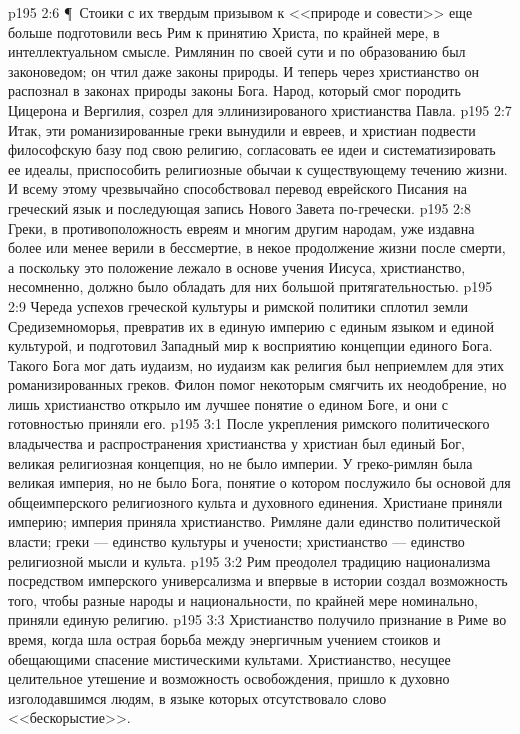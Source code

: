 \vs p195 2:6 \P\ Стоики с их твердым призывом к <<природе и совести>> еще больше подготовили весь Рим к принятию Христа, по крайней мере, в интеллектуальном смысле. Римлянин по своей сути и по образованию был законоведом; он чтил даже законы природы. И теперь через христианство он распознал в законах природы законы Бога. Народ, который смог породить Цицерона и Вергилия, созрел для эллинизированого христианства Павла.
\vs p195 2:7 Итак, эти романизированные греки вынудили и евреев, и христиан подвести философскую базу под свою религию, согласовать ее идеи и систематизировать ее идеалы, приспособить религиозные обычаи к существующему течению жизни. И всему этому чрезвычайно способствовал перевод еврейского Писания на греческий язык и последующая запись Нового Завета по\hyp{}гречески.
\vs p195 2:8 Греки, в противоположность евреям и многим другим народам, уже издавна более или менее верили в бессмертие, в некое продолжение жизни после смерти, а поскольку это положение лежало в основе учения Иисуса, христианство, несомненно, должно было обладать для них большой притягательностью.
\vs p195 2:9 Череда успехов греческой культуры и римской политики сплотил земли Средиземноморья, превратив их в единую империю с единым языком и единой культурой, и подготовил Западный мир к восприятию концепции единого Бога. Такого Бога мог дать иудаизм, но иудаизм как религия был неприемлем для этих романизированных греков. Филон помог некоторым смягчить их неодобрение, но лишь христианство открыло им лучшее понятие о едином Боге, и они с готовностью приняли его.
\vs p195 3:1 После укрепления римского политического владычества и распространения христианства у христиан был единый Бог, великая религиозная концепция, но не было империи. У греко\hyp{}римлян была великая империя, но не было Бога, понятие о котором послужило бы основой для общеимперского религиозного культа и духовного единения. Христиане приняли империю; империя приняла христианство. Римляне дали единство политической власти; греки --- единство культуры и учености; христианство --- единство религиозной мысли и культа.
\vs p195 3:2 Рим преодолел традицию национализма посредством имперского универсализма и впервые в истории создал возможность того, чтобы разные народы и национальности, по крайней мере номинально, приняли единую религию.
\vs p195 3:3 Христианство получило признание в Риме во время, когда шла острая борьба между энергичным учением стоиков и обещающими спасение мистическими культами. Христианство, несущее целительное утешение и возможность освобождения, пришло к духовно изголодавшимся людям, в языке которых отсутствовало слово <<бескорыстие>>.
